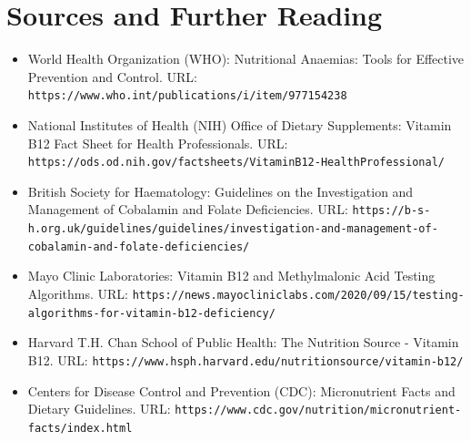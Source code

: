 \section*{Sources and Further Reading}
\begin{itemize}
    \item World Health Organization (WHO): Nutritional Anaemias: Tools for Effective Prevention and Control. URL: \texttt{https://www.who.int/publications/i/item/977154238}
    \item National Institutes of Health (NIH) Office of Dietary Supplements: Vitamin B12 Fact Sheet for Health Professionals. URL: \texttt{https://ods.od.nih.gov/factsheets/VitaminB12-HealthProfessional/}
    \item British Society for Haematology: Guidelines on the Investigation and Management of Cobalamin and Folate Deficiencies. URL: \texttt{https://b-s-h.org.uk/guidelines/guidelines/investigation-and-management-of-cobalamin-and-folate-deficiencies/}
    \item Mayo Clinic Laboratories: Vitamin B12 and Methylmalonic Acid Testing Algorithms. URL: \texttt{https://news.mayocliniclabs.com/2020/09/15/testing-algorithms-for-vitamin-b12-deficiency/}
    \item Harvard T.H. Chan School of Public Health: The Nutrition Source - Vitamin B12. URL: \texttt{https://www.hsph.harvard.edu/nutritionsource/vitamin-b12/}
    \item Centers for Disease Control and Prevention (CDC): Micronutrient Facts and Dietary Guidelines. URL: \texttt{https://www.cdc.gov/nutrition/micronutrient-facts/index.html}
\end{itemize}